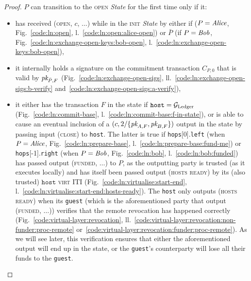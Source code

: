\begin{proof}
  $P$ can transition to the \textsc{open} \textit{State} for the first time only
  if it:
  \begin{itemize}
    \item has received (\textsc{open}, $c$, $\dots$) while in the \textsc{init}
    \textit{State} by either \environment if ($P = \mathit{Alice}$,
    Fig.~\ref{code:ln:open}, l.~\ref{code:ln:open:alice-open}) or $\bar{P}$ (if
    $P = \mathit{Bob}$, Fig.~\ref{code:ln:exchange-open-keys:bob-open},
    l.~\ref{code:ln:exchange-open-keys:bob-open}),
    \item it internally holds a signature on the commitment transaction $C_{P,
    0}$ that is valid by $\textit{pk}_{\bar{P}, F}$
    (Fig.~\ref{code:ln:exchange-open-sigs},
    ll.~\ref{code:ln:exchange-open-sigs:b-verify}
    and~\ref{code:ln:exchange-open-sigs:a-verify}),
    \item it either has the transaction $F$ in the \ledger state if
    $\texttt{host} = \mathcal{G}_{\mathrm{Ledger}}$ (Fig.~\ref{code:ln:commit-base},
    l.~\ref{code:ln:commit-base:f-in-state}), or is able to cause an eventual
    inclusion of a $(c, 2/\{\textit{pk}_{A, F}, \textit{pk}_{B, F}\})$ output in the \ledger state
    by passing input (\textsc{close}) to \texttt{host}. The latter is true if
    \texttt{hops}[0].\texttt{left} (when $P = \mathit{Alice}$,
    Fig.~\ref{code:ln:prepare-base}, l.~\ref{code:ln:prepare-base:fund-me}) or
    \texttt{hops}[-1].\texttt{right} (when $P = \mathit{Bob}$, Fig.~\ref{code:ln:bob},
    l.~\ref{code:ln:bob:funded}) has passed output (\textsc{funded}, $\dots$) to
    $P$, as the outputting party is trusted (as it executes locally) and has
    itself been passed output (\textsc{hosts ready}) by its (also trusted)
    $\texttt{host}$ \textsc{virt} ITI (Fig.~\ref{code:ln:virtualise:start-end},
    l.~\ref{code:ln:virtualise:start-end:hosts-ready}). The \texttt{host}
    only outputs (\textsc{hosts ready}) when its \texttt{guest} (which is the
    aforementioned party that output (\textsc{funded}, $\dots$)) verifies that
    the remote revocation has happened correctly
    (Fig.~\ref{code:virtual-layer:revocation},
    ll.~\ref{code:virtual-layer:revocation:non-funder:proc-remote}
    or~\ref{code:virtual-layer:revocation:funder:proc-remote}). As we will see
    later, this verification ensures that either the aforementioned output will
    end up in the \ledger state, or the \texttt{guest}'s counterparty will lose
    all their funds to the \texttt{guest}.
  \end{itemize}
\end{proof}
